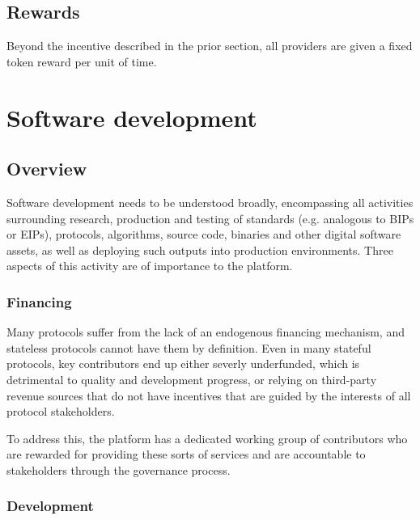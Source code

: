 \documentclass{article}
\begin{document}
\subsection{Rewards}

Beyond the incentive described in the prior section, all providers are given a fixed token reward per unit of time.

\section{Software development}

\subsection{Overview}

Software development needs to be understood broadly, encompassing all activities surrounding research, production and testing of standards (e.g. analogous to BIPs or EIPs), protocols, algorithms, source code, binaries and other digital software assets, as well as deploying such outputs into production environments. Three aspects of this activity are of importance to the platform.

\subsubsection{Financing}

Many protocols suffer from the lack of an endogenous financing mechanism, and stateless protocols cannot have them by definition. Even in many stateful protocols, key contributors end up either severly underfunded, which is detrimental to quality and development progress, or  relying on third-party revenue sources that do not have incentives that are guided by the interests of all protocol stakeholders.

To address this, the platform has a dedicated working group of contributors who are rewarded for providing these sorts of services and are accountable to stakeholders through the governance process.

\subsubsection{Development}
\end{document}
